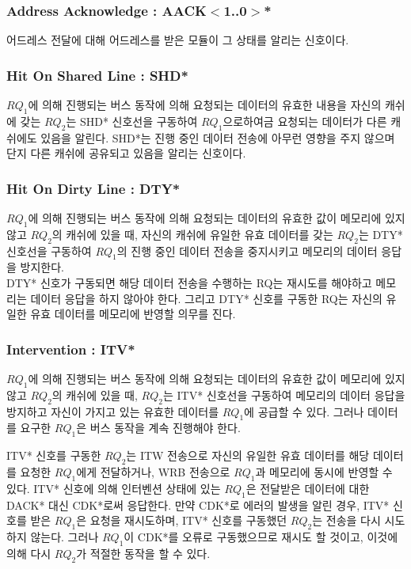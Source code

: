 \subsubsection{Address Acknowledge : AACK$<$1..0$>$*}
어드레스 전달에 대해 어드레스를 받은 모듈이 그 상태를 알리는 신호이다.

%
\subsubsection{Hit On Shared Line : SHD*}
$RQ_1$에 의해 진행되는 버스 동작에 의해 요청되는 데이터의 유효한 내용을 
자신의 캐쉬에 갖는 $RQ_2$는 SHD* 신호선을 구동하여 $RQ_1$으로하여금
요청되는 데이터가 다른 캐쉬에도 있음을 알린다.
SHD*는 진행 중인 데이터 전송에 아무런 영향을 주지 않으며
단지 다른 캐쉬에 공유되고 있음을 알리는 신호이다.

%
\subsubsection{Hit On Dirty Line : DTY*}
$RQ_1$에 의해 진행되는 버스 동작에 의해 요청되는 데이터의 유효한 값이 메모리에 있지 않고
$RQ_2$의 캐쉬에 있을 때,
자신의 캐쉬에 유일한 유효 데이터를 갖는 $RQ_2$는 DTY* 신호선을 구동하여
$RQ_1$의 진행 중인 데이터 전송을 중지시키고 메모리의 데이터 응답을 방지한다. \\
DTY* 신호가 구동되면 해당 데이터 전송을 수행하는 RQ는 재시도를 해야하고
메모리는 데이터 응답을 하지 않아야 한다.
그리고 DTY* 신호를 구동한 RQ는 자신의 유일한 유효 데이터를 메모리에
반영할 의무를 진다.

%
\subsubsection{Intervention : ITV*}
$RQ_1$에 의해 진행되는 버스 동작에 의해 요청되는 데이터의 유효한 값이 메모리에 있지 않고
$RQ_2$의 캐쉬에 있을 때,
$RQ_2$는 ITV* 신호선을 구동하여 메모리의 데이터
응답을 방지하고 자신이 가지고 있는 유효한 데이터를 $RQ_1$에 공급할 수 있다.
그러나 데이터를 요구한 $RQ_1$은 버스 동작을 계속 진행해야 한다.

ITV* 신호를 구동한 $RQ_2$는 ITW 전송으로
자신의 유일한 유효 데이터를 해당 데이터를 요청한 $RQ_1$에게 전달하거나,
WRB 전송으로 $RQ_1$과 메모리에 동시에 반영할 수 있다.
ITV* 신호에 의해 인터벤션 상태에 있는 $RQ_1$은 전달받은 데이터에 대한 DACK* 대신
CDK*로써 응답한다. 만약 CDK*로 에러의 발생을 알린 경우, ITV* 신호를 받은 $RQ_1$은 요청을
재시도하며, ITV* 신호를 구동했던 $RQ_2$는 전송을 다시 시도하지 않는다.
그러나 $RQ_1$이 CDK*를 오류로 구동했으므로 재시도 할 것이고,
이것에 의해 다시 $RQ_2$가 적절한 동작을 할 수 있다.

